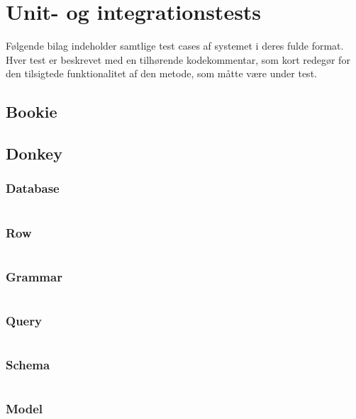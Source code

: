 \chapter{Unit- og integrationstests}

Følgende bilag indeholder samtlige test cases af systemet i deres fulde format. Hver test er beskrevet med en tilhørende kodekommentar, som kort redegør for den tilsigtede funktionalitet af den metode, som måtte være under test.

\section{Bookie}

\section{Donkey}

\subsection{Database}
\inputminted{java}{../src/test/java/dk/itu/donkey/DatabaseTest.java}

\subsection{Row}
\inputminted{java}{../src/test/java/dk/itu/donkey/RowTest.java}

\subsection{Grammar}
\inputminted{java}{../src/test/java/dk/itu/donkey/GrammarTest.java}

\subsection{Query}
\inputminted{java}{../src/test/java/dk/itu/donkey/QueryTest.java}

\subsection{Schema}
\inputminted{java}{../src/test/java/dk/itu/donkey/SchemaTest.java}

\subsection{Model}
\inputminted{java}{../src/test/java/dk/itu/donkey/ModelTest.java}